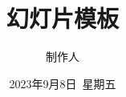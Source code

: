 \documentclass[aspectratio=169,11pt,a4paper,c]{beamer}
\title{幻灯片模板}
\author{制作人}
\institute{所属机构}
\date{2023年9月8日\ 星期五}
\begin{document}
\begin{frame}
    \titlepage
\end{frame}


\end{document}
